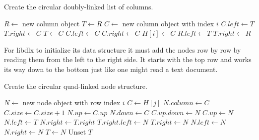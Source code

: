 \begin{algorithm}[H]
	\caption{Create the circular doubly-linked list of columns.}
	\label{alg:columns}
	\begin{distribalgo}[1]
		\STATE $R \leftarrow$ new column object
		\STATE $T \leftarrow R$
			\STATE $C \leftarrow$ new column object with index $i$
				\STATE $C.left \leftarrow T$
				\STATE $T.right \leftarrow C$
				\STATE $T \leftarrow C$
			\ELSE
				\STATE $C.left \leftarrow C$  \label{alg:secondaryb}
				\STATE $C.right \leftarrow C$  \label{alg:secondarye}
			\ENDIF
			\STATE $H[i] \leftarrow C$
		\ENDFOR
		\STATE $R.left \leftarrow T$
		\STATE $T.right \leftarrow R$
	\end{distribalgo}
\end{algorithm}

For libdlx to initialize its data structure it must add the nodes row by row by reading them from the left to the right side.
It starts with the top row and works its way down to the bottom just like one might read a text document.

\begin{algorithm}[H]
	\caption{Create the circular quad-linked node structure.}
	\label{alg:nodes}
	\begin{distribalgo}[1]
				\STATE $N \leftarrow$ new node object with row index $i$
				\STATE $C \leftarrow H[j]$
				\STATE $N.column \leftarrow C$
				\STATE $C.size \leftarrow C.size + 1$
				\STATE $N.up \leftarrow C.up$
				\STATE $N.down \leftarrow C$
				\STATE $C.up.down \leftarrow N$
				\STATE $C.up \leftarrow N$
					\STATE $N.left \leftarrow T$
					\STATE $N.right \leftarrow T.right$
					\STATE $T.right.left \leftarrow N$
					\STATE $T.right \leftarrow N$
				\ELSE
					\STATE $N.left \leftarrow N$  
					\STATE $N.right \leftarrow N$
				\ENDIF
				\STATE $T \leftarrow N$
			\ENDFOR
			\STATE Unset $T$
		\ENDFOR
	\end{distribalgo}
\end{algorithm}
